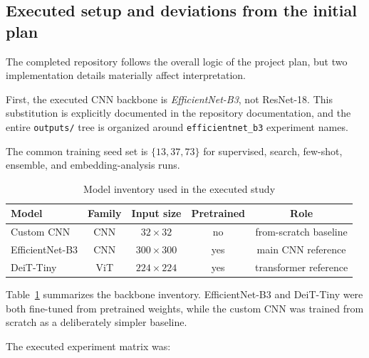 \documentclass[12pt,a4paper]{article}
\begin{document}
\subsection{Executed setup and deviations from the initial plan}
\label{subsec:setup}

The completed repository follows the overall logic of the project plan, but two implementation details materially affect interpretation.

First, the executed CNN backbone is \emph{EfficientNet-B3}, not ResNet-18. This substitution is explicitly documented in the repository documentation, and the entire \texttt{outputs/} tree is organized around \texttt{efficientnet\_b3} experiment names.


The common training seed set is $\{13, 37, 73\}$ for supervised, search, few-shot, ensemble, and embedding-analysis runs.

\begin{table}[t!]
\centering
\caption{Model inventory used in the executed study}
\label{tab:models}
\smallskip
\small
\begin{tabular}{@{}lcccc@{}}
\toprule
\textbf{Model} & \textbf{Family} & \textbf{Input size} & \textbf{Pretrained} & \textbf{Role} \\
\midrule
Custom CNN & CNN & $32 \times 32$ & no & from-scratch baseline \\
EfficientNet-B3 & CNN & $300 \times 300$ & yes & main CNN reference \\
DeiT-Tiny & ViT & $224 \times 224$ & yes & transformer reference \\
\bottomrule
\end{tabular}
\end{table}

Table~\ref{tab:models} summarizes the backbone inventory. EfficientNet-B3 and DeiT-Tiny were both fine-tuned from pretrained weights, while the custom CNN was trained from scratch as a deliberately simpler baseline.

The executed experiment matrix was:
\end{document}
